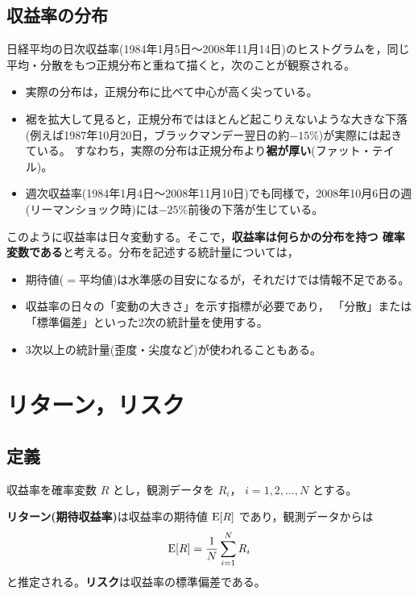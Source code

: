 \subsection{収益率の分布}

日経平均の日次収益率(1984年1月5日〜2008年11月14日)のヒストグラムを，同じ
平均・分散をもつ正規分布と重ねて描くと，次のことが観察される。

\begin{itemize}
\item 実際の分布は，正規分布に比べて中心が高く尖っている。
\item 裾を拡大して見ると，正規分布ではほとんど起こりえないような大きな下落
(例えば1987年10月20日，ブラックマンデー翌日の約$-15\%$)が実際には起きている。
すなわち，実際の分布は正規分布より\textbf{裾が厚い}(ファット・テイル)。
\item 週次収益率(1984年1月4日〜2008年11月10日)でも同様で，2008年10月6日の週
(リーマンショック時)には$-25\%$前後の下落が生じている。
\end{itemize}

このように収益率は日々変動する。そこで，\textbf{収益率は何らかの分布を持つ
確率変数である}と考える。分布を記述する統計量については，
\begin{itemize}
\item 期待値($=$平均値)は水準感の目安になるが，それだけでは情報不足である。
\item 収益率の日々の「変動の大きさ」を示す指標が必要であり，
「分散」または「標準偏差」といった2次の統計量を使用する。
\item 3次以上の統計量(歪度・尖度など)が使われることもある。
\end{itemize}

\section{リターン，リスク}

\subsection{定義}

収益率を確率変数 $R$ とし，観測データを $R_i$， $i=1,2,\dots,N$ とする。

\begin{definition}[リターンとリスク]
\textbf{リターン(期待収益率)}は収益率の期待値 $\mathrm{E}[R]$ であり，観測データからは
\begin{equation}
\mathrm{E}[R] = \frac{1}{N}\sum_{i=1}^{N} R_i
\end{equation}
と推定される。\textbf{リスク}は収益率の標準偏差である。
\end{definition}

